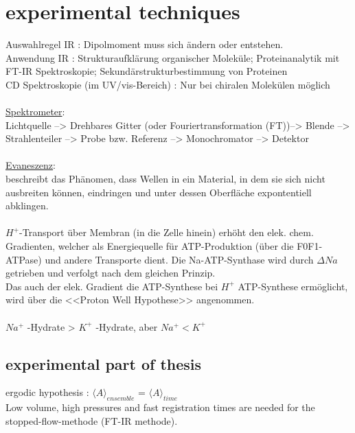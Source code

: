 \documentclass[12pt,a4paper,bibliography=totocnumbered]{scrartcl}
\begin{document}
\section{experimental techniques}
Auswahlregel IR : Dipolmoment muss sich ändern oder entstehen.\\
Anwendung IR : Strukturaufklärung organischer Moleküle; Proteinanalytik mit FT-IR Spektroskopie; Sekundärstrukturbestimmung von Proteinen \\
CD Spektroskopie (im UV/vis-Bereich) : Nur bei chiralen Molekülen möglich \\\\
\underline{Spektrometer}:\\
Lichtquelle --> Drehbares Gitter  (oder Fouriertransformation (FT))--> Blende --> Strahlenteiler --> Probe bzw. Referenz --> Monochromator --> Detektor\\\\
\underline{Evaneszenz}:\\
beschreibt das Phänomen, dass Wellen in ein Material, in dem sie sich nicht ausbreiten können, eindringen und unter dessen Oberfläche expontentiell abklingen.\\\\
$H^+$-Transport über Membran (in die Zelle hinein) erhöht den elek. chem. Gradienten, welcher als Energiequelle für ATP-Produktion (über die F0F1-ATPase) und andere Transporte dient. Die Na-ATP-Synthase wird durch $\Delta Na$ getrieben und verfolgt nach dem gleichen Prinzip.\\ Das auch der elek. Gradient die ATP-Synthese bei $H^+$ ATP-Synthese ermöglicht, wird über die <<Proton Well Hypothese>> angenommen.\\\\
$Na^+$ -Hydrate > $K^+$ -Hydrate, aber $Na^+<K^+$
\subsection{experimental part of thesis}
ergodic hypothesis : $\langle A \rangle_{ensemble}$ = $\langle A \rangle_{time}$\\
Low volume, high pressures and fast registration times are needed for the stopped-flow-methode (FT-IR methode).
\end{document}
